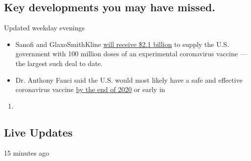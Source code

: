 \hypertarget{key-developments-you-may-have-missed}{%
\subsection{Key developments you may have
missed.}\label{key-developments-you-may-have-missed}}

Updated weekday evenings

\begin{itemize}
\tightlist
\item
  Sanofi and GlaxoSmithKline
  \href{https://www.nytimes.com/2020/07/31/health/covid-19-vaccine-sanofi-gsk.html}{will
  receive \$2.1 billion} to supply the U.S. government with 100 million
  doses of an experimental coronavirus vaccine --- the largest such deal
  to date.
\item
  Dr. Anthony Fauci said the U.S. would most likely have a safe and
  effective coronavirus vaccine
  \href{https://www.nytimes.com/aponline/2020/07/31/us/politics/ap-us-virus-outbreak-fauci.html}{by
  the end of 2020} or early in
\end{itemize}

\begin{enumerate}
\def\labelenumi{\arabic{enumi}.}
\setcounter{enumi}{2020}
\item
\end{enumerate}

\hypertarget{live-updates}{%
\subsection{Live Updates}\label{live-updates}}

15 minutes ago

